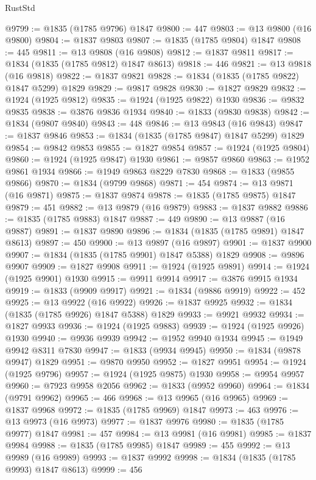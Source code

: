 \begin{lexlean}{RustStd}
\begin{coremodule}
{\begin{coremodule}
{{{{{@9799 := @1835 (@1785 @9796) @1847
@9800 := 447
@9803 := @13 @9800 (@16 @9800)
@9804 := @1837 @9803
@9807 := @1835 (@1785 @9804) @1847
@9808 := 445
@9811 := @13 @9808 (@16 @9808)
@9812 := @1837 @9811
@9817 := @1834 (@1835 (@1785 @9812) @1847 @8613)
@9818 := 446
@9821 := @13 @9818 (@16 @9818)
@9822 := @1837 @9821
@9828 := @1834 (@1835 (@1785 @9822) @1847 @5299) @1829
@9829 := @9817 @9828
@9830 := @1827 @9829
@9832 := @1924 (@1925 @9812)
@9835 := @1924 (@1925 @9822) @1930
@9836 := @9832 @9835
@9838 := @3876 @9836 @1934
@9840 := @1833 (@9830 @9838)
@9842 := @1834 (@9807 @9840)
@9843 := 448
@9846 := @13 @9843 (@16 @9843)
@9847 := @1837 @9846
@9853 := @1834 (@1835 (@1785 @9847) @1847 @5299) @1829
@9854 := @9842 @9853
@9855 := @1827 @9854
@9857 := @1924 (@1925 @9804)
@9860 := @1924 (@1925 @9847) @1930
@9861 := @9857 @9860
@9863 := @1952 @9861 @1934
@9866 := @1949 @9863 @8229 @7830
@9868 := @1833 (@9855 @9866)
@9870 := @1834 (@9799 @9868)
@9871 := 454
@9874 := @13 @9871 (@16 @9871)
@9875 := @1837 @9874
@9878 := @1835 (@1785 @9875) @1847
@9879 := 451
@9882 := @13 @9879 (@16 @9879)
@9883 := @1837 @9882
@9886 := @1835 (@1785 @9883) @1847
@9887 := 449
@9890 := @13 @9887 (@16 @9887)
@9891 := @1837 @9890
@9896 := @1834 (@1835 (@1785 @9891) @1847 @8613)
@9897 := 450
@9900 := @13 @9897 (@16 @9897)
@9901 := @1837 @9900
@9907 := @1834 (@1835 (@1785 @9901) @1847 @5388) @1829
@9908 := @9896 @9907
@9909 := @1827 @9908
@9911 := @1924 (@1925 @9891)
@9914 := @1924 (@1925 @9901) @1930
@9915 := @9911 @9914
@9917 := @3876 @9915 @1934
@9919 := @1833 (@9909 @9917)
@9921 := @1834 (@9886 @9919)
@9922 := 452
@9925 := @13 @9922 (@16 @9922)
@9926 := @1837 @9925
@9932 := @1834 (@1835 (@1785 @9926) @1847 @5388) @1829
@9933 := @9921 @9932
@9934 := @1827 @9933
@9936 := @1924 (@1925 @9883)
@9939 := @1924 (@1925 @9926) @1930
@9940 := @9936 @9939
@9942 := @1952 @9940 @1934
@9945 := @1949 @9942 @8311 @7830
@9947 := @1833 (@9934 @9945)
@9950 := @1834 (@9878 @9947) @1829
@9951 := @9870 @9950
@9952 := @1827 @9951
@9954 := @1924 (@1925 @9796)
@9957 := @1924 (@1925 @9875) @1930
@9958 := @9954 @9957
@9960 := @7923 @9958 @2056
@9962 := @1833 (@9952 @9960)
@9964 := @1834 (@9791 @9962)
@9965 := 466
@9968 := @13 @9965 (@16 @9965)
@9969 := @1837 @9968
@9972 := @1835 (@1785 @9969) @1847
@9973 := 463
@9976 := @13 @9973 (@16 @9973)
@9977 := @1837 @9976
@9980 := @1835 (@1785 @9977) @1847
@9981 := 457
@9984 := @13 @9981 (@16 @9981)
@9985 := @1837 @9984
@9988 := @1835 (@1785 @9985) @1847
@9989 := 455
@9992 := @13 @9989 (@16 @9989)
@9993 := @1837 @9992
@9998 := @1834 (@1835 (@1785 @9993) @1847 @8613)
@9999 := 456
}}}}}
\end{coremodule}}
\end{coremodule}
\end{lexlean}
